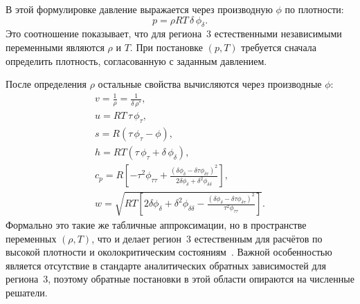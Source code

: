 В этой формулировке давление выражается через производную $\phi$ по плотности:
\begin{equation}
p = \rho R T\,\delta\,\phi_{\delta}.
\end{equation}
Это соотношение показывает,
что для региона~3 естественными независимыми переменными
являются $\rho$ и $T$.
При постановке $(p, T)$ требуется сначала определить плотность,
согласованную с заданным давлением.

После определения $\rho$
остальные свойства вычисляются через производные $\phi$:
\begin{gather}
v = \frac{1}{\rho} = \frac{1}{\delta\,\rho^{*}}, \\
u = R T\,\tau\,\phi_{\tau}, \\
s = R \left(\tau\,\phi_{\tau} - \phi\right), \\
h = R T \left(\tau\,\phi_{\tau} + \delta\,\phi_{\delta}\right), \\
c_{p} = R \left[
-\tau^{2}\phi_{\tau\tau}
+ \frac{\left(\delta\phi_{\delta} - \delta\tau\phi_{\delta\tau}\right)^{2}}
{2\delta\phi_{\delta} + \delta^{2}\phi_{\delta\delta}}
\right], \\
w = \sqrt{R T \left[
2\delta\phi_{\delta} + \delta^{2}\phi_{\delta\delta}
- \frac{\left(\delta\phi_{\delta} - \delta\tau\phi_{\delta\tau}\right)^{2}}
{\tau^{2}\phi_{\tau\tau}}
\right]}.
\end{gather}
Формально это такие же табличные аппроксимации,
но в пространстве переменных $(\rho, T)$,
что и делает регион~3 естественным для расчётов
по высокой плотности и околокритическим состояниям~\cite{iapws_if97_2012}.
Важной особенностью является отсутствие
в стандарте аналитических обратных зависимостей для региона~3,
поэтому обратные постановки в этой области
опираются на численные решатели.

